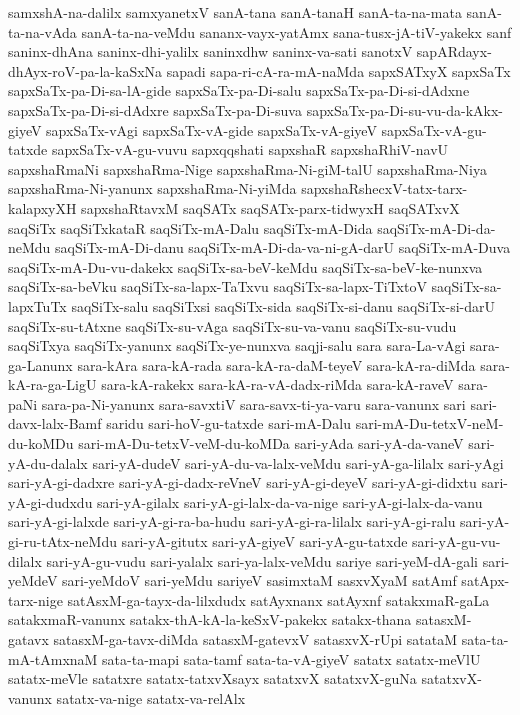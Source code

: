 {samxshA-na-dalilx
samxyanetxV
sanA-tana
sanA-tanaH
sanA-ta-na-mata
sanA-ta-na-vAda
sanA-ta-na-veMdu
sananx-vayx-yatAmx
sana-tusx-jA-tiV-yakekx
sanf
saninx-dhAna
saninx-dhi-yalilx
saninxdhw
saninx-va-sati
sanotxV
sapARdayx-dhAyx-roV-pa-la-kaSxNa
sapadi
sapa-ri-cA-ra-mA-naMda
sapxSATxyX
sapxSaTx
sapxSaTx-pa-Di-sa-lA-gide
sapxSaTx-pa-Di-salu
sapxSaTx-pa-Di-si-dAdxne
sapxSaTx-pa-Di-si-dAdxre
sapxSaTx-pa-Di-suva
sapxSaTx-pa-Di-su-vu-da-kAkx-giyeV
sapxSaTx-vAgi
sapxSaTx-vA-gide
sapxSaTx-vA-giyeV
sapxSaTx-vA-gu-tatxde
sapxSaTx-vA-gu-vuvu
sapxqqshati
sapxshaR
sapxshaRhiV-navU
sapxshaRmaNi
sapxshaRma-Nige
sapxshaRma-Ni-giM-talU
sapxshaRma-Niya
sapxshaRma-Ni-yanunx
sapxshaRma-Ni-yiMda
sapxshaRshecxV-tatx-tarx-kalapxyXH
sapxshaRtavxM
saqSATx
saqSATx-parx-tidwyxH
saqSATxvX
saqSiTx
saqSiTxkataR
saqSiTx-mA-Dalu
saqSiTx-mA-Dida
saqSiTx-mA-Di-da-neMdu
saqSiTx-mA-Di-danu
saqSiTx-mA-Di-da-va-ni-gA-darU
saqSiTx-mA-Duva
saqSiTx-mA-Du-vu-dakekx
saqSiTx-sa-beV-keMdu
saqSiTx-sa-beV-ke-nunxva
saqSiTx-sa-beVku
saqSiTx-sa-lapx-TaTxvu
saqSiTx-sa-lapx-TiTxtoV
saqSiTx-sa-lapxTuTx
saqSiTx-salu
saqSiTxsi
saqSiTx-sida
saqSiTx-si-danu
saqSiTx-si-darU
saqSiTx-su-tAtxne
saqSiTx-su-vAga
saqSiTx-su-va-vanu
saqSiTx-su-vudu
saqSiTxya
saqSiTx-yanunx
saqSiTx-ye-nunxva
saqji-salu
sara
sara-La-vAgi
sara-ga-Lanunx
sara-kAra
sara-kA-rada
sara-kA-ra-daM-teyeV
sara-kA-ra-diMda
sara-kA-ra-ga-LigU
sara-kA-rakekx
sara-kA-ra-vA-dadx-riMda
sara-kA-raveV
sara-paNi
sara-pa-Ni-yanunx
sara-savxtiV
sara-savx-ti-ya-varu
sara-vanunx
sari
sari-davx-lalx-Bamf
saridu
sari-hoV-gu-tatxde
sari-mA-Dalu
sari-mA-Du-tetxV-neM-du-koMDu
sari-mA-Du-tetxV-veM-du-koMDa
sari-yAda
sari-yA-da-vaneV
sari-yA-du-dalalx
sari-yA-dudeV
sari-yA-du-va-lalx-veMdu
sari-yA-ga-lilalx
sari-yAgi
sari-yA-gi-dadxre
sari-yA-gi-dadx-reVneV
sari-yA-gi-deyeV
sari-yA-gi-didxtu
sari-yA-gi-dudxdu
sari-yA-gilalx
sari-yA-gi-lalx-da-va-nige
sari-yA-gi-lalx-da-vanu
sari-yA-gi-lalxde
sari-yA-gi-ra-ba-hudu
sari-yA-gi-ra-lilalx
sari-yA-gi-ralu
sari-yA-gi-ru-tAtx-neMdu
sari-yA-gitutx
sari-yA-giyeV
sari-yA-gu-tatxde
sari-yA-gu-vu-dilalx
sari-yA-gu-vudu
sari-yalalx
sari-ya-lalx-veMdu
sariye
sari-yeM-dA-gali
sari-yeMdeV
sari-yeMdoV
sari-yeMdu
sariyeV
sasimxtaM
sasxvXyaM
satAmf
satApx-tarx-nige
satAsxM-ga-tayx-da-lilxdudx
satAyxnanx
satAyxnf
satakxmaR-gaLa
satakxmaR-vanunx
satakx-thA-kA-la-keSxV-pakekx
satakx-thana
satasxM-gatavx
satasxM-ga-tavx-diMda
satasxM-gatevxV
satasxvX-rUpi
satataM
sata-ta-mA-tAmxnaM
sata-ta-mapi
sata-tamf
sata-ta-vA-giyeV
satatx
satatx-meVlU
satatx-meVle
satatxre
satatx-tatxvXsayx
satatxvX
satatxvX-guNa
satatxvX-vanunx
satatx-va-nige
satatx-va-relAlx
}
